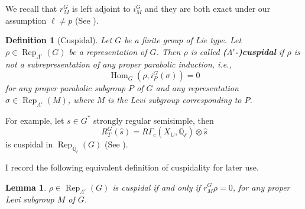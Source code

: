 \documentclass{article}
\newcommand{\red}[1]{\textcolor{red}{#1}}
\newtheorem{lemma}{Lemma}
\newtheorem{question}{Question}
\newtheorem{definition}{Definition}
\newcommand{\Hom}{\operatorname{Hom}}
\newcommand{\Rep}{\operatorname{Rep}}
\begin{document}
	We recall that $r_M^G$ is left adjoint to $i_M^G$ and they are both exact under our assumption $\ell \neq p$ (See \cite[II.2.1]{vigneras1996representations}).
	
	\begin{definition}[Cuspidal]\label{Def Cuspidal}
		Let $G$ be a finite group of Lie type. Let $\rho \in \Rep_{\Lambda'}(G)$ be a representation of $G$. Then $\rho$ is called \textbf{($\Lambda'$-)cuspidal} if $\rho$ is not a subrepresentation of any proper parabolic induction, i.e., 
		$$\Hom_{G}(\rho, i_P^G(\sigma))=0$$ 
		for any proper parabolic subgroup $P$ of $G$ and any representation $\sigma \in \Rep_{\Lambda'}(M)$, where $M$ is the Levi subgroup corresponding to $P$.
	\end{definition}
	
	For example, let $s \in G^*$ strongly regular semisimple, then 
	$$R_T^G(\hat{s})=R\Gamma_c(X_{\mathbb{U}}, \overline{\mathbb{Q}_\ell})\otimes \hat{s}$$ 
	is cuspidal in $\Rep_{\overline{\mathbb{Q}_{\ell}}}(G)$ (See \cite[Theorem 8.3]{deligne1976representations}). 
	
	I record the following equivalent definition of cuspidality for later use.
	
	\begin{lemma}\cite[II.2.3]{vigneras1996representations}\label{Lemma Cuspidal}
		$\rho \in \Rep_{\Lambda'}(G)$ is cuspidal if and only if $r_M^G\rho=0$, for any proper Levi subgroup $M$ of $G$.
	\end{lemma}
	
%	
	
	
\end{document}
